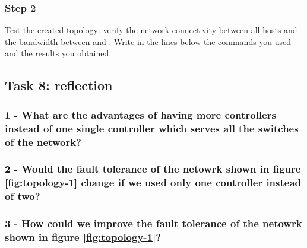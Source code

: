 \subsubsection*{Step 2}
Test the created topology: verify the network connectivity between all hosts
and the bandwidth between  and . Write in the lines below the
commands you used and the results you obtained.

\hrulefill

\hrulefill

\hrulefill

\hrulefill





\subsection*{Task 8: reflection}
\subsubsection*{1 - What are the advantages of having more controllers instead of one
single controller which serves all the switches of the network?}
\hrulefill

\hrulefill

\hrulefill

\hrulefill

\subsubsection*{2 - Would the fault tolerance of the netowrk shown in figure
\ref{fig:topology-1} change if we used only one controller instead of two?}
\hrulefill

\hrulefill

\hrulefill

\hrulefill

\subsubsection*{3 - How could we improve the fault tolerance of the netowrk shown
in figure \ref{fig:topology-1}?} %
\hrulefill

\hrulefill

\hrulefill

\hrulefill



